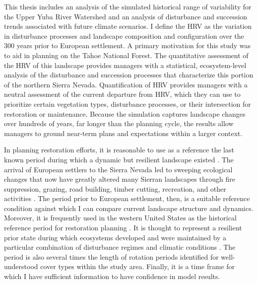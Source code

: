 This thesis includes an analysis of the simulated historical range of variability for the Upper Yuba River Watershed and an analysis of disturbance and succession trends associated with future climate scenarios. I define the HRV as the variation in disturbance processes and landscape composition and configuration over the 300 years prior to European settlement. A primary motivation for this study was to aid in planning on the Tahoe National Forest. The quantitative assessment of the HRV of this landscape provides managers with a statistical, ecosystem-level analysis of the disturbance and succession processes that characterize this portion of the northern Sierra Nevada. Quantification of HRV provides managers with a neutral assessment of the current departure from HRV, which they can use to prioritize certain vegetation types, disturbance processes, or their intersection for restoration or maintenance. Because the simulation captures landscape changes over hundreds of years, far longer than the planning cycle, the results allow managers to ground near-term plans and expectations within a larger context. 

In planning restoration efforts, it is reasonable to use as a reference the last known period during which a dynamic but resilient landscape existed \citep{Swetnam1999}. The arrival of European settlers to the Sierra Nevada led to sweeping ecological changes that now have greatly altered many Sierran landscapes through fire suppression, grazing, road building, timber cutting, recreation, and other activities \citep{Storer1963,Stephens2015,Knapp2013,Hessburg2005}. The period prior to European settlement, then, is a suitable reference condition against which I can compare current landscape structure and dynamics. Moreover, it is frequently used in the western United States as the historical reference period for restoration planning \citep{Safford2013}. It is thought to represent a resilient prior state during which ecosystems developed and were maintained by a particular combination of disturbance regimes and climatic conditions \citep{VandeWater2011,Meyer2013}. The period is also several times the length of rotation periods identified for well-understood cover types within the study area. Finally, it is a time frame for which I have sufficient information to have confidence in model results. 

